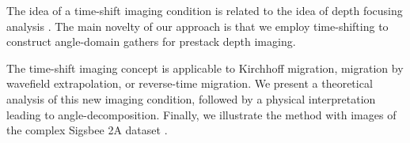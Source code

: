 The idea of a time-shift imaging condition is related to the idea of
depth focusing analysis 
\cite[]{SEG-1986-S7.6,
GEO57-12-16081622,GEO58-08-11481156,
SEG-1995-0465,SEG-1996-0463}.
The main novelty of our approach is that we employ time-shifting 
to construct angle-domain gathers for prestack depth imaging.

The time-shift imaging concept is applicable to Kirchhoff 
migration, migration by wavefield extrapolation, or 
reverse-time migration.
We present a theoretical analysis of this new imaging condition,
followed by a physical interpretation leading to angle-decomposition.
Finally, we illustrate the method with images of the complex Sigsbee 2A
dataset \cite[]{SEG-2002-21222125}.

